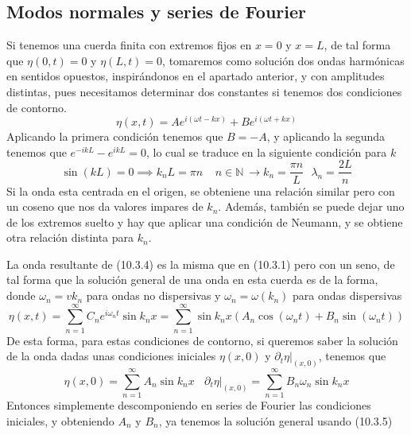 \subsection{Modos normales y series de Fourier}
Si tenemos una cuerda finita con extremos fijos en $x=0$ y $x=L$, de tal forma que $\eta(0,t) = 0$ y $\eta(L,t) =0$, tomaremos como solución dos ondas harmónicas en sentidos opuestos, inspirándonos en el apartado anterior, y con amplitudes distintas, pues necesitamos determinar dos constantes si tenemos dos condiciones de contorno.
\[\eta(x,t) = A e^{i(\omega t - kx)}+B e^{i(\omega t + kx)}\]
Aplicando la primera condición tenemos que $B=-A$, y aplicando la segunda tenemos que $e^{-ikL} - e^{ikL} = 0$, lo cual se traduce en la siguiente condición para $k$
\begin{equation} \label{6.1.1}
    \sin(kL) = 0 \implies k_n L = \pi n \ \ \ \ \ n\in \mathbb{N} \ \rightarrow k_n = \frac{\pi n}{L} \ \ \ \lambda_n = \frac{2L}{n}
\end{equation}
Si la onda esta centrada en el origen, se obteniene una relación similar pero con un coseno que nos da valores impares de $k_n$. Además, también se puede dejar uno de los extremos suelto y hay que aplicar una condición de Neumann, y se obtiene otra relación distinta para $k_n$.

La onda resultante de (10.3.4) es la misma que en (10.3.1) pero con un seno, de tal forma que la solución general de una onda en esta cuerda es de la forma, donde $\omega_n = v k_n$ para ondas no dispersivas y $\omega_n=\omega(k_n)$ para ondas dispersivas
\begin{equation} \label{6.1.1}
    \eta(x,t) = \sum_{n=1}^\infty C_n e^{i\omega_n t} \sin{k_n x} = \sum_{n=1}^\infty \sin{k_n x}\left(A_n \cos(\omega_n t)+B_n \sin(\omega_n t)\right)
\end{equation}
De esta forma, para estas condiciones de contorno, si queremos saber la solución de la onda dadas unas condiciones iniciales $\eta(x,0)$ y $\partial_t \eta |_{(x,0)}$, tenemos que
\begin{equation} \label{6.1.1}
    \eta(x,0) =  \sum_{n=1}^\infty A_n \sin{k_n x} \ \ \ \ \partial_t \eta |_{(x,0)} = \sum_{n=1}^\infty B_n \omega_n \sin{k_n x}
\end{equation}
Entonces simplemente descomponiendo en series de Fourier las condiciones iniciales, y obteniendo $A_n$ y $B_n$, ya tenemos la solución general usando (10.3.5)

